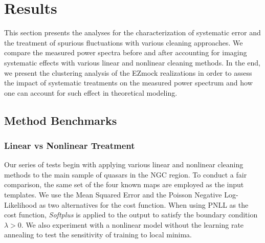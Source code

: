 \section{Results}\label{sec:results}

This section presents the analyses for the characterization of systematic error and the treatment of spurious fluctuations with various cleaning approaches. We compare the measured power spectra before and after accounting for imaging systematic effects with various linear and nonlinear cleaning methods. In the end, we present the clustering analysis of the EZmock realizations in order to assess the impact of systematic treatments on the measured power spectrum and how one can account for such effect in theoretical modeling.

\subsection{Method Benchmarks}

\subsubsection{Linear vs Nonlinear Treatment}\label{subsec:linvsnonlin}

Our series of tests begin with applying various linear and nonlinear cleaning methods to the main sample of quasars in the NGC region. To conduct a fair comparison, the same set of the four known maps are employed as the input templates. We use the Mean Squared Error and the Poisson Negative Log-Likelihood as two alternatives for the cost function. When using PNLL as the cost function, \textit{Softplus} is applied to the output to satisfy the boundary condition $\lambda > 0$. We also experiment with a nonlinear model without the learning rate annealing to test the sensitivity of training to local minima.

